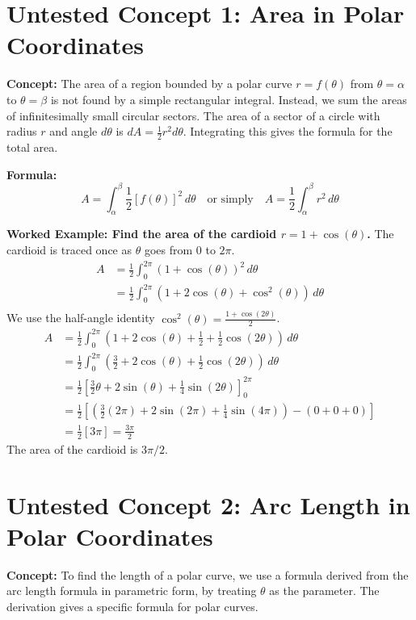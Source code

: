 \documentclass{article}
\begin{document}
\section{Untested Concept 1: Area in Polar Coordinates}

\textbf{Concept:} The area of a region bounded by a polar curve \(r = f(\theta)\) from \(\theta = \alpha\) to \(\theta = \beta\) is not found by a simple rectangular integral. Instead, we sum the areas of infinitesimally small circular sectors. The area of a sector of a circle with radius \(r\) and angle \(d\theta\) is \(dA = \frac{1}{2}r^2 d\theta\). Integrating this gives the formula for the total area.

\textbf{Formula:}
\[ A = \int_{\alpha}^{\beta} \frac{1}{2} [f(\theta)]^2 \,d\theta \quad \text{or simply} \quad A = \frac{1}{2} \int_{\alpha}^{\beta} r^2 \,d\theta \]

\textbf{Worked Example: Find the area of the cardioid \(r = 1 + \cos(\theta)\).}
The cardioid is traced once as \(\theta\) goes from \(0\) to \(2\pi\).
\begin{align*}
A &= \frac{1}{2} \int_{0}^{2\pi} (1 + \cos(\theta))^2 \,d\theta \\
&= \frac{1}{2} \int_{0}^{2\pi} (1 + 2\cos(\theta) + \cos^2(\theta)) \,d\theta \\
\end{align*}
We use the half-angle identity \(\cos^2(\theta) = \frac{1 + \cos(2\theta)}{2}\).
\begin{align*}
A &= \frac{1}{2} \int_{0}^{2\pi} \left(1 + 2\cos(\theta) + \frac{1}{2} + \frac{1}{2}\cos(2\theta)\right) \,d\theta \\
&= \frac{1}{2} \int_{0}^{2\pi} \left(\frac{3}{2} + 2\cos(\theta) + \frac{1}{2}\cos(2\theta)\right) \,d\theta \\
&= \frac{1}{2} \left[ \frac{3}{2}\theta + 2\sin(\theta) + \frac{1}{4}\sin(2\theta) \right]_{0}^{2\pi} \\
&= \frac{1}{2} \left[ \left(\frac{3}{2}(2\pi) + 2\sin(2\pi) + \frac{1}{4}\sin(4\pi)\right) - \left(0 + 0 + 0\right) \right] \\
&= \frac{1}{2} [3\pi] = \frac{3\pi}{2}
\end{align*}
The area of the cardioid is \(3\pi/2\).

\section{Untested Concept 2: Arc Length in Polar Coordinates}

\textbf{Concept:} To find the length of a polar curve, we use a formula derived from the arc length formula in parametric form, by treating \(\theta\) as the parameter. The derivation gives a specific formula for polar curves.
\end{document}
